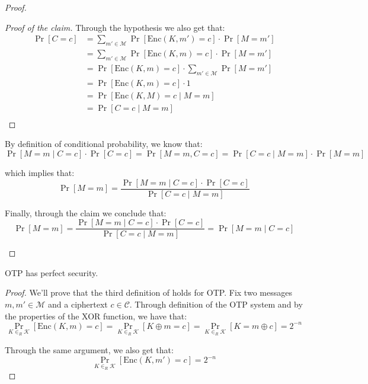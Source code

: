 \documentclass[a4paper, 12pt]{report}
\begin{document}
\begin{proof}
\begin{enumerate}
\begin{proof}[Proof of the claim]
                Through the hypothesis we also get that:
                \[\begin{split}
                    \Pr[C = c] &= \sum_{m' \in \mathcal{M}} \Pr[\mathrm{Enc}(K,m') = c] \cdot \Pr[M = m'] \\
                    &= \sum_{m' \in \mathcal{M}} \Pr[\mathrm{Enc}(K,m) = c] \cdot \Pr[M = m'] \\
                    &= \Pr[\mathrm{Enc}(K,m) = c] \cdot \sum_{m' \in \mathcal{M}} \Pr[M = m'] \\
                    &= \Pr[\mathrm{Enc}(K,m) = c] \cdot 1\\
                    &= \Pr[\mathrm{Enc}(K,M) = c \mid M = m]\\
                    &= \Pr[C = c \mid M = m]\\
                \end{split}\]
            \end{proof}

            By definition of conditional probability, we know that:
            \[ \Pr[M = m \mid C = c] \cdot \Pr[C = c] = \Pr[M = m, C = c] = \Pr[C = c \mid M = m] \cdot \Pr[M = m]\]
            
            which implies that:
            \[\Pr[M = m] = \frac{\Pr[M = m \mid C = c] \cdot \Pr[C = c]}{\Pr[C = c \mid M = m]}\]

            Finally, through the claim we conclude that:
            \[\Pr[M = m] = \frac{\Pr[M = m \mid C = c] \cdot \Pr[C = c]}{\Pr[C = c \mid M = m]} = \Pr[M = m \mid C = c]\]
        \end{enumerate}
    \end{proof}

    \begin{framedprop}{}
        OTP has perfect security.
    \end{framedprop}

    \begin{proof}
        We'll prove that the third definition of  holds for OTP. Fix two messages $m,m' \in \mathcal{M}$ and a ciphertext $c \in \mathcal{C}$. Through definition of the OTP system and by the properties of the XOR function, we have that:
        \[\Pr_{K \in_R \mathcal{K}}[\mathrm{Enc}(K, m) = c] = \Pr_{K \in_R \mathcal{K}}[K \oplus m = c] = \Pr_{K \in_R \mathcal{K}}[K = m \oplus c] = 2^{-n}\]
        
        Through the same argument, we also get that:
        \[\Pr_{K \in_R \mathcal{K}}[\mathrm{Enc}(K, m') = c] = 2^{-n}\]
    \end{proof}
\end{document}
